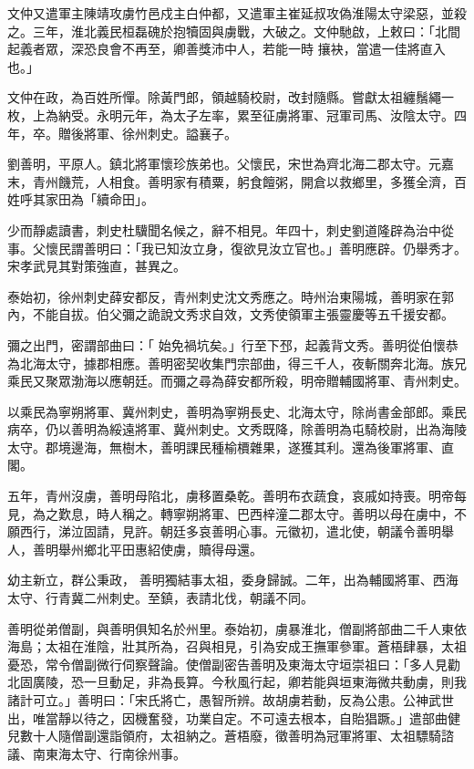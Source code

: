 \begin{pinyinscope}
 文仲又遣軍主陳靖攻虜竹邑戍主白仲都，又遣軍主崔延叔攻偽淮陽太守梁惡，並殺之。三年，淮北義民桓磊磈於抱犢固與虜戰，大破之。文仲馳啟，上敕曰：「北間起義者眾，深恐良會不再至，卿善獎沛中人，若能一時
 攘袂，當遣一佳將直入也。」



 文仲在政，為百姓所憚。除黃門郎，領越騎校尉，改封隨縣。嘗獻太祖纏鬚繩一枚，上為納受。永明元年，為太子左率，累至征虜將軍、冠軍司馬、汝陰太守。四年，卒。贈後將軍、徐州刺史。謚襄子。



 劉善明，平原人。鎮北將軍懷珍族弟也。父懷民，宋世為齊北海二郡太守。元嘉末，青州饑荒，人相食。善明家有積粟，躬食饘粥，開倉以救鄉里，多獲全濟，百姓呼其家田為「續命田」。



 少而靜處讀書，刺史杜驥聞名候之，辭不相見。年四十，刺史劉道隆辟為治中從事。父懷民謂善明曰：「我已知汝立身，復欲見汝立官也。」善明應辟。仍舉秀才。宋孝武見其對策強直，甚異之。



 泰始初，徐州刺史薛安都反，青州刺史沈文秀應之。時州治東陽城，善明家在郭內，不能自拔。伯父彌之詭說文秀求自效，文秀使領軍主張靈慶等五千援安都。



 彌之出門，密謂部曲曰：「
 始免禍坑矣。」行至下邳，起義背文秀。善明從伯懷恭為北海太守，據郡相應。善明密契收集門宗部曲，得三千人，夜斬關奔北海。族兄乘民又聚眾渤海以應朝廷。而彌之尋為薛安都所殺，明帝贈輔國將軍、青州刺史。



 以乘民為寧朔將軍、冀州刺史，善明為寧朔長史、北海太守，除尚書金部郎。乘民病卒，仍以善明為綏遠將軍、冀州刺史。文秀既降，除善明為屯騎校尉，出為海陵太守。郡境邊海，無樹木，善明課民種榆檟雜果，遂獲其利。還為後軍將軍、直閣。



 五年，青州沒虜，善明母陷北，虜移置桑乾。善明布衣蔬食，哀戚如持喪。明帝每見，為之歎息，時人稱之。轉寧朔將軍、巴西梓潼二郡太守。善明以母在虜中，不願西行，涕泣固請，見許。朝廷多哀善明心事。元徽初，遣北使，朝議令善明舉人，善明舉州鄉北平田惠紹使虜，贖得母還。



 幼主新立，群公秉政，
 善明獨結事太祖，委身歸誠。二年，出為輔國將軍、西海太守、行青冀二州刺史。至鎮，表請北伐，朝議不同。



 善明從弟僧副，與善明俱知名於州里。泰始初，虜暴淮北，僧副將部曲二千人東依海島；太祖在淮陰，壯其所為，召與相見，引為安成王撫軍參軍。蒼梧肆暴，太祖憂恐，常令僧副微行伺察聲論。使僧副密告善明及東海太守垣崇祖曰：「多人見勸北固廣陵，恐一旦動足，非為長算。今秋風行起，卿若能與垣東海微共動虜，則我諸計可立。」善明曰：「宋氏將亡，愚智所辨。故胡虜若動，反為公患。公神武世出，唯當靜以待之，因機奮發，功業自定。不可遠去根本，自貽猖蹶。」遣部曲健兒數十人隨僧副還詣領府，太祖納之。蒼梧廢，徵善明為冠軍將軍、太祖驃騎諮議、南東海太守、行南徐州事。




\end{pinyinscope}

